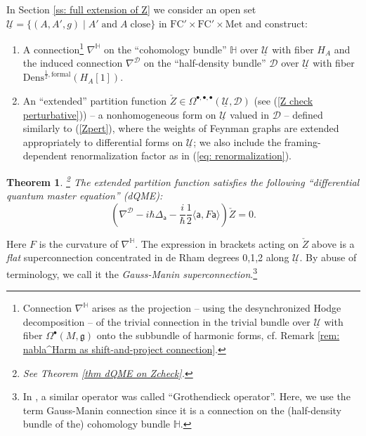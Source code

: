 \documentclass[11pt,a4paper]{amsart}
\theoremstyle{plain} %
\newtheorem{thm}{Theorem}[section]
\theoremstyle{definition}
\theoremstyle{remark}
\newcommand{\g}{\mathfrak{g}}
\newcommand{\mr}{\mathrm}
\newcommand{\sfa}{\mathsf{a}}
\newcommand{\bt}{\bullet}
\newcommand{\mc}{\mathcal}
\newcommand{\FC}{\mathrm{FC}}
\newcommand{\UU}{\underline{\mc{U}}}
\begin{document}
In Section \ref{ss: full extension of Z} we consider an open set $\UU=\{(A,A',g)\;|\;A'\mr{\;and\;}A\;\mr{close}\}$ in $\FC'\times\FC'\times \mr{Met}$ and construct: 
\begin{enumerate}
\item A connection\footnote{Connection $\nabla^\mathbb{H}$ arises as the projection -- using the desynchronized Hodge decomposition -- of the trivial connection in the trivial bundle over $\UU$ with fiber $\Omega^\bt(M,\g)$ onto the subbundle of harmonic forms, cf. Remark \ref{rem: nabla^Harm as shift-and-project connection}.} 
$\nabla^{\mathbb{H}}$ on the ``cohomology bundle'' $\mathbb{H}$ over $\UU$ with fiber $H_A$ and the induced connection
$\nabla^\mc{D}$ on the ``half-density bundle'' $\mc{D}$ over $\UU$ with fiber $\mr{Dens}^{\frac12,\mr{formal}}(H_A[1])$. 
\item An ``extended'' partition function $\check{Z}\in \Omega^{\bt,\bt,\bt}(\UU,\mc{D})$ (see (\ref{Z check perturbative})) -- a nonhomogeneous form on $\UU$ valued in $\mc{D}$ -- defined similarly to (\ref{Zpert}), where the weights of Feynman graphs are extended appropriately to differential forms on $\UU$; we also include the framing-dependent renormalization factor as in (\ref{eq: renormalization}).
\end{enumerate}

\begin{thm}\footnote{See Theorem \ref{thm dQME on Zcheck}.}
The extended partition function satisfies the following ``differential quantum master equation'' (dQME):
\begin{equation}\label{intro dQME}
    (\nabla^\mc{D}-i\hbar\Delta_\sfa-\frac{i}{\hbar}\frac12 \langle \sfa, F \sfa \rangle) \check{Z}%
    =0.
\end{equation}
\end{thm}
Here $F$ is the curvature of $\nabla^\mathbb{H}$. The expression in brackets acting on $\check{Z}$ above is a \emph{flat} superconnection concentrated in de Rham degrees 0,1,2 along $\UU$. By abuse of terminology, we call it the \emph{Gauss-Manin superconnection}.\footnote{In \cite{Cattaneo2019}, \cite{Cattaneo2020} a similar operator was called ``Grothendieck operator''. Here, we use the term Gauss-Manin connection since it is a connection on the (half-density bundle of the) cohomology bundle $\mathbb{H}$.}
\end{document}
